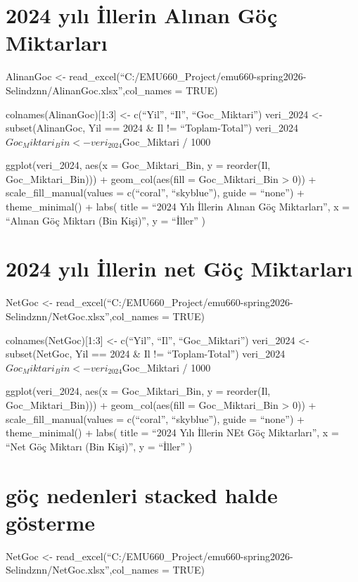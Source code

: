 \documentclass[
  11pt,
  a4paper,
  DIV=11,
  numbers=noendperiod]{scrartcl}
\newcounter{none} %
\begin{document}
\section{2024 yılı İllerin Alınan Göç
Miktarları}\label{yux131lux131-illerin-alux131nan-guxf6uxe7-miktarlarux131}

AlinanGoc \textless-
read\_excel(``C:/EMU660\_Project/emu660-spring2026-Selindznn/AlinanGoc.xlsx'',col\_names
= TRUE)

colnames(AlinanGoc){[}1:3{]} \textless- c(``Yil'', ``Il'',
``Goc\_Miktari'') veri\_2024 \textless- subset(AlinanGoc, Yil == 2024 \&
Il != ``Toplam-Total'')
veri\_2024\(Goc_Miktari_Bin <- veri_2024\)Goc\_Miktari / 1000

ggplot(veri\_2024, aes(x = Goc\_Miktari\_Bin, y = reorder(Il,
Goc\_Miktari\_Bin))) + geom\_col(aes(fill = Goc\_Miktari\_Bin
\textgreater{} 0)) + scale\_fill\_manual(values = c(``coral'',
``skyblue''), guide = ``none'') + theme\_minimal() + labs( title =
``2024 Yılı İllerin Alınan Göç Miktarları'', x = ``Alınan Göç Miktarı
(Bin Kişi)'', y = ``İller'' )

\section{2024 yılı İllerin net Göç
Miktarları}\label{yux131lux131-illerin-net-guxf6uxe7-miktarlarux131}

NetGoc \textless-
read\_excel(``C:/EMU660\_Project/emu660-spring2026-Selindznn/NetGoc.xlsx'',col\_names
= TRUE)

colnames(NetGoc){[}1:3{]} \textless- c(``Yil'', ``Il'',
``Goc\_Miktari'') veri\_2024 \textless- subset(NetGoc, Yil == 2024 \& Il
!= ``Toplam-Total'')
veri\_2024\(Goc_Miktari_Bin <- veri_2024\)Goc\_Miktari / 1000

ggplot(veri\_2024, aes(x = Goc\_Miktari\_Bin, y = reorder(Il,
Goc\_Miktari\_Bin))) + geom\_col(aes(fill = Goc\_Miktari\_Bin
\textgreater{} 0)) + scale\_fill\_manual(values = c(``coral'',
``skyblue''), guide = ``none'') + theme\_minimal() + labs( title =
``2024 Yılı İllerin NEt Göç Miktarları'', x = ``Net Göç Miktarı (Bin
Kişi)'', y = ``İller'' )

\section{göç nedenleri stacked halde
gösterme}\label{guxf6uxe7-nedenleri-stacked-halde-guxf6sterme}

NetGoc \textless-
read\_excel(``C:/EMU660\_Project/emu660-spring2026-Selindznn/NetGoc.xlsx'',col\_names
= TRUE)
\end{document}
